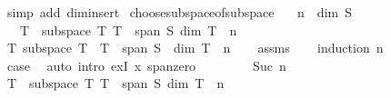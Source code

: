 \begin{isabellebody}
%
\isatagproof
{}\isamarkupfalse%
\ {\isacharparenleft}{\kern0pt}simp\ add{\isacharcolon}{\kern0pt}\ dim{\isacharunderscore}{\kern0pt}insert{\isacharparenright}{\kern0pt}%
\endisatagproof
{\isafoldproof}%
%
\isadelimproof
\isanewline
%
\endisadelimproof
\isanewline
{}\isamarkupfalse%
\ choose{\isacharunderscore}{\kern0pt}subspace{\isacharunderscore}{\kern0pt}of{\isacharunderscore}{\kern0pt}subspace{\isacharcolon}{\kern0pt}\isanewline
\ \ \ {\isachardoublequoteopen}n\ {\isasymle}\ dim\ S{\isachardoublequoteclose}\isanewline
\ \ \ T\ \ {\isachardoublequoteopen}subspace\ T{\isachardoublequoteclose}\ {\isachardoublequoteopen}T\ {\isasymsubseteq}\ span\ S{\isachardoublequoteclose}\ {\isachardoublequoteopen}dim\ T\ {\isacharequal}{\kern0pt}\ n{\isachardoublequoteclose}\isanewline
%
\isadelimproof
%
\endisadelimproof
%
\isatagproof
{}\isamarkupfalse%
\ {\isacharminus}{\kern0pt}\isanewline
\ \ \isamarkupfalse%
\ {\isachardoublequoteopen}{\isasymexists}T{\isachardot}{\kern0pt}\ subspace\ T\ {\isasymand}\ T\ {\isasymsubseteq}\ span\ S\ {\isasymand}\ dim\ T\ {\isacharequal}{\kern0pt}\ n{\isachardoublequoteclose}\isanewline
\ \ \isamarkupfalse%
\ assms\isanewline
\ \ \isamarkupfalse%
\ {\isacharparenleft}{\kern0pt}induction\ n{\isacharparenright}{\kern0pt}\isanewline
\ \ \ \ \isamarkupfalse%
\ {}\ \isamarkupfalse%
\ \isamarkupfalse%
\ {\isacharquery}{\kern0pt}case\ \isamarkupfalse%
\ {\isacharparenleft}{\kern0pt}auto\ intro{\isacharbang}{\kern0pt}{\isacharcolon}{\kern0pt}\ exI{\isacharbrackleft}{\kern0pt}\ x{\isacharequal}{\kern0pt}{\isachardoublequoteopen}{\isacharbraceleft}{\kern0pt}{}{\isacharbraceright}{\kern0pt}{\isachardoublequoteclose}{\isacharbrackright}{\kern0pt}\ span{\isacharunderscore}{\kern0pt}zero{\isacharparenright}{\kern0pt}\isanewline
\ \ \isamarkupfalse%
\isanewline
\ \ \ \ \isamarkupfalse%
\ {\isacharparenleft}{\kern0pt}Suc\ n{\isacharparenright}{\kern0pt}\isanewline
\ \ \ \ \isamarkupfalse%
\ \isamarkupfalse%
\ T\ \ {\isachardoublequoteopen}subspace\ T{\isachardoublequoteclose}\ {\isachardoublequoteopen}T\ {\isasymsubseteq}\ span\ S{\isachardoublequoteclose}\ {\isachardoublequoteopen}dim\ T\ {\isacharequal}{\kern0pt}\ n{\isachardoublequoteclose}\isanewline
\ \ \ \ \ \ \isamarkupfalse%

\end{isabellebody}
